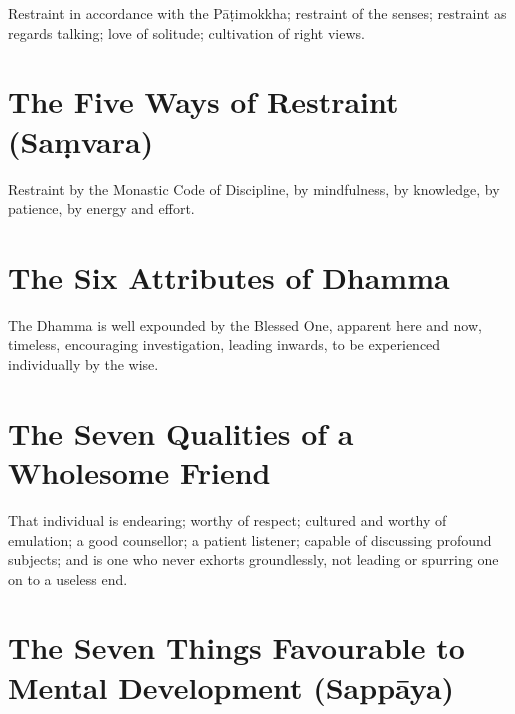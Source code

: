 Restraint in accordance with the Pāṭimokkha; restraint of the senses; restraint
as regards talking; love of solitude; cultivation of right views.


\ifhandbookedition
\vspace*{-\baselineskip}
\fi

\section*{The Five Ways of Restraint (Saṃvara)}

Restraint by the Monastic Code of Discipline, by mindfulness, by knowledge, by
patience, by energy and effort.


\ifhandbookedition
\vspace*{-\baselineskip}
\fi

\section*{The Six Attributes of Dhamma}

The Dhamma is well expounded by the Blessed One,
apparent here and now, timeless, encouraging investigation,
leading inwards, to be experienced individually by the wise.


\ifhandbookedition
\vspace*{-\baselineskip}
\fi

\section*{The Seven Qualities of a Wholesome Friend}


That individual is endearing; worthy of respect; cultured and worthy of
emulation; a good counsellor; a patient listener; capable of discussing profound
subjects; and is one who never exhorts groundlessly, not leading or spurring one
on to a useless end.


\ifhandbookedition
\vspace*{-\baselineskip}
\fi

\section*{The Seven Things Favourable to Mental Development (Sappāya)}

